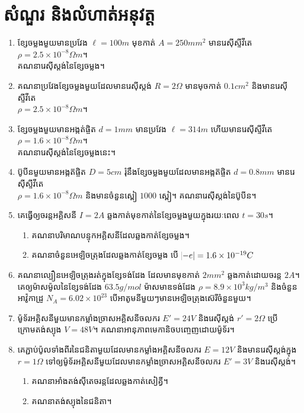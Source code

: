 \section{សំណួរ និងលំហាត់អនុវត្ត}
\begin{enumerate}
	\item ខ្សែចម្លងមួយមានប្រវែង $\ell=100m$ មុខកាត់ $A=250mm^{2}$ មានរេស៊ីស្ទីវីតេ $\rho=2.5\times10^{-8}\Omega m$។ \\គណនារេស៊ីស្តង់នៃខ្សែចម្លង។
	\item គណនាប្រវែងខ្សែចម្លងមួយដែលមានរេស៊ីស្តង់ $R=2\Omega$ មានមុចកាត់ $0.1cm^{2}$ និងមានរេស៊ីស្ទីវីតេ \\$\rho=2.5\times10^{-8}\Omega m$។
	\item ខ្សែចម្លងមួយមានអង្កត់ផ្ចិត $d=1mm$ មានប្រវែង $\ell=314m$ ហើយមានរេស៊ីស្ទីវីតេ $\rho=1.6\times10^{-8}\Omega m$។\\ គណនារេស៊ីស្តង់នៃខ្សែចម្លងនេះ។
	\item ប៊ូបីនមួយមានអង្កត៊ផ្ចិត $D=5cm$ រុំនឹងខ្សែចម្លងមួយដែលមានអង្កត៊ផ្ចិត $d=0.8mm$ មានរេស៊ីស្ទីវីតេ \\$\rho=1.6\times10^{-8}\Omega m$ និងមានចំនួនស្ពៀ $1000$ ស្ពៀ។ គណនារេស៊ីស្តង់នៃប៊ូបីន។
	\item គេធ្វើឲ្យចរន្តអគ្គិសនី $I=2A$ ឆ្លងកាត់មុខកាត់នៃខ្សែចម្លងមួយក្នុងរយៈពេល $t=30s$។
	\begin{enumerate}
		\item គណនាបរិមាណបន្ទុកអគ្គិសនីដែលឆ្លងកាត់ខ្សែចម្លង។
		\item គណនាចំនួនអេឡិចត្រុងដែលឆ្លងកាត់ខ្សែចម្លង បើ $\abs{-e}=1.6\times10^{-19}C$
	\end{enumerate}
	\item គណនាល្បឿនអេឡិចត្រុងរត់ក្នុងខ្សែទង់ដែង ដែលមានមុខកាត់ $2mm^{2}$ ឆ្លងកាត់ដោយចរន្ត $2A$។ គេឲ្យម៉ាសម៉ូលនៃខ្សែទង់ដែង $63.5g/mol$ ម៉ាសមាឌទង់ដែង $\rho=8.9\times10^{3}kg/m^{3}$ និងចំនួនអាវ៉ូកាដ្រូ $N_{A}=6.02\times10^{23}$ បើអាតូមនីមួយៗមានអេឡិចត្រុងស៊េរីចំនួនមួយ។
	\item ម៉ូទ័រអគ្គិសនីមួយមានកម្លាំងច្រាសអគ្គិសនីចលករ $E'=24V$ និងរេស៊ីស្តង់ $r'=2\Omega$ ប្រើក្រោមតង់ស្យុង $V=48V$។ គណនាអានុភាពមេកានិចបញ្ចេញដោយម៉ូទ័រ។
	\item គេភ្ជាប់ប៉ូលទាំងពីរនៃជនិតាមួយដែលមានកម្លាំងអគ្គិសនីចលករ $E=12V$ និងមានរេស៊ីស្តង់ក្នុង $r=1\Omega$ ទៅឲ្យម៉ូទ័រអគ្គិសនីមួយដែលមានកម្លាំងច្រាសអគ្គិសនីចលករ $E'=3V$ និងរេស៊ីស្តង់។
	\begin{enumerate}
		\item គណនាអាំងតង់ស៊ីតេចរន្តដែលឆ្លងកាត់សៀគ្វី។
		\item គណនាតង់ស្យុងនៃជនិតា។
	\end{enumerate}

\end{enumerate}

